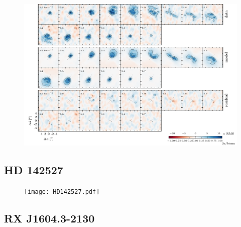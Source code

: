 \documentclass[twocolumn]{aastex6}
\begin{document}
\begin{figure}[htb]
\begin{center}
  \includegraphics{IMLup.pdf}
  \end{center}
\end{figure}

\subsection{HD 142527}


\begin{figure}[htb]
\begin{center}
  \texttt{[image: HD142527.pdf]}
  \end{center}
\end{figure}

\subsection{RX J1604.3-2130}
\end{document}
